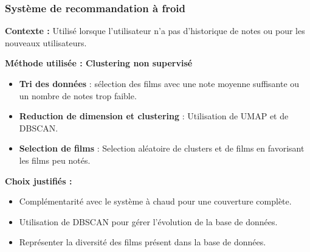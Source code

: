 \documentclass{beamer}
\begin{document}
    \begin{frame}
        \scriptsize
        \frametitle{Système de recommandation à froid}
        \textbf{Contexte :} Utilisé lorsque l’utilisateur n’a pas d’historique de notes ou pour les nouveaux utilisateurs.

        \vspace{0.3cm}
        \textbf{Méthode utilisée : Clustering non supervisé}
        \begin{itemize}
            \item \textbf{Tri des données} : sélection des films avec une note moyenne suffisante ou un nombre de notes trop faible.
            \item \textbf{Reduction de dimension et clustering} : Utilisation de UMAP et de DBSCAN.
            \item \textbf{Selection de films} : Selection aléatoire de clusters et de films en favorisant les films peu notés.
        \end{itemize}

        \vspace{0.3cm}
        \textbf{Choix justifiés :}
        \begin{itemize}
            \item Complémentarité avec le système à chaud pour une couverture complète.
            \item Utilisation de DBSCAN pour gérer l'évolution de la base de données.
            \item Représenter la diversité des films présent dans la base de données.
        \end{itemize}
    \end{frame}




\end{document}
